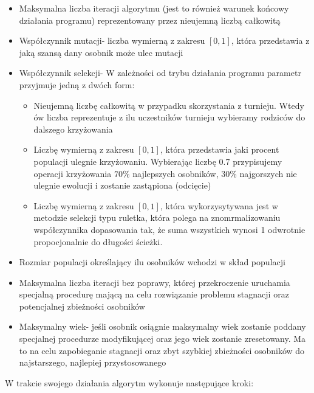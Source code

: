   \begin{itemize}
    \item Maksymalna liczba iteracji algorytmu (jest to również warunek końcowy działania programu) reprezentowany przez nieujemną liczbą całkowitą
    \item Współczynnik mutacji- liczba wymierną z zakresu $[0,1]$, która przedstawia z jaką szansą dany osobnik może ulec mutacji
    \item Współczynnik selekcji- W zależności od trybu działania programu parametr przyjmuje jedną z dwóch form:
    \begin{itemize}
      \item Nieujemną liczbę całkowitą w przypadku skorzystania z turnieju. Wtedy ów liczba reprezentuje z ilu uczestników turnieju wybieramy rodziców do dalszego krzyżowania
      \item Liczbę wymierną z zakresu $[0,1]$, która przedstawia jaki procent populacji ulegnie krzyżowaniu. Wybierając liczbę 0.7 przypisujemy operacji krzyżowania $70\%$ najlepszych osobników, $30\%$ najgorszych nie ulegnie ewolucji i zostanie zastąpiona (odcięcie)
      \item Liczbę wymierną z zakresu $[0,1]$, która wykorzysytywana jest w metodzie selekcji typu ruletka, która polega na znomrmalizowaniu współczynnika dopasowania tak, że suma wszystkich wynosi 1 odwrotnie propocjonalnie do długości ścieżki.
    \end{itemize}
    \item Rozmiar populacji określający ilu osobników wchodzi w skład populacji
    \item Maksymalna liczba iteracji bez poprawy, której przekroczenie uruchamia specjalną procedurę mającą na celu rozwiązanie problemu stagnacji oraz potencjalnej zbieżności osobników
    \item Maksymalny wiek- jeśli osobnik osiągnie maksymalny wiek zostanie poddany specjalnej procedurze modyfikującej oraz jego wiek zostanie zresetowany. Ma to na celu zapobieganie stagnacji oraz zbyt szybkiej zbieżności osobników do najstarszego, najlepiej przystosowanego
  \end{itemize}
  W trakcie swojego działania algorytm wykonuje następujące kroki:
